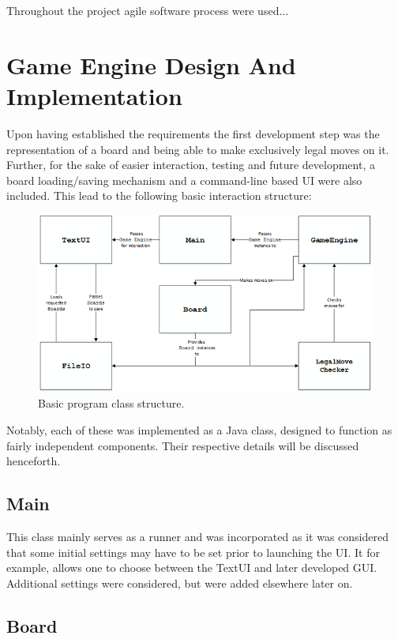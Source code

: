 \documentclass{l3proj}
\begin{document}
Throughout the project agile software process were used...

\section{Game Engine Design And Implementation}

Upon having established the requirements the first development step was the representation of a board and being able to make exclusively legal moves on it. Further, for the sake of easier interaction, testing and future development, a board loading/saving mechanism and a command-line based UI were also included. This lead to the following basic interaction structure:

\begin{figure}[H]
\centering
\includegraphics[scale=1]{Images/S33Diagram.png}
\caption{Basic program class structure.}
\end{figure}

Notably, each of these was implemented as a Java class, designed to function as fairly independent components. Their respective details will be discussed henceforth.

\subsection{Main}

This class mainly serves as a runner and was incorporated as it was considered that some initial settings may have to be set prior to launching the UI. It for example, allows one to choose between the TextUI and later developed GUI. Additional settings were considered, but were added elsewhere later on.

\subsection{Board}
\end{document}
